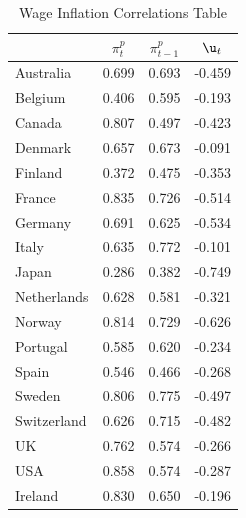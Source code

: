 \begin{table}[htbp]
\caption{\label{T_Correlation} Wage Inflation Correlations Table}\centering\medskip
\begin{tabular}{lccc} \hline \hline
 & $\pi_t^p$  & $\pi_{t-1}^p$  & $\u_t$  \\  \hline 
Australia &     0.699 &     0.693 &    -0.459 \\  
Belgium &     0.406 &     0.595 &    -0.193 \\  
Canada &     0.807 &     0.497 &    -0.423 \\  
Denmark &     0.657 &     0.673 &    -0.091 \\  
Finland &     0.372 &     0.475 &    -0.353 \\  
France &     0.835 &     0.726 &    -0.514 \\  
Germany &     0.691 &     0.625 &    -0.534 \\  
Italy &     0.635 &     0.772 &    -0.101 \\  
Japan &     0.286 &     0.382 &    -0.749 \\  
Netherlands &     0.628 &     0.581 &    -0.321 \\  
Norway &     0.814 &     0.729 &    -0.626 \\  
Portugal &     0.585 &     0.620 &    -0.234 \\  
Spain &     0.546 &     0.466 &    -0.268 \\  
Sweden &     0.806 &     0.775 &    -0.497 \\  
Switzerland &     0.626 &     0.715 &    -0.482 \\  
UK &     0.762 &     0.574 &    -0.266 \\  
USA &     0.858 &     0.574 &    -0.287 \\  
Ireland &     0.830 &     0.650 &    -0.196 \\  
\hline \hline \end{tabular}
\end{table}
